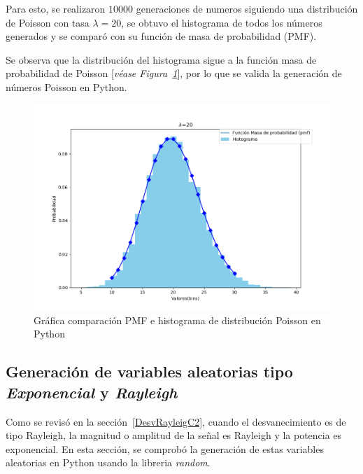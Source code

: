 Para esto, se realizaron $10000$ generaciones de numeros siguiendo una distribución de Poisson con tasa $\lambda = 20$, se obtuvo el histograma de todos los números generados y se comparó con su función de masa de probabilidad (PMF).\newline

Se observa que la distribución del histograma sigue a la función masa de probabilidad de Poisson [\textit{véase Figura~\ref{fig:generacionPoisson}}], por lo que se valida la generación de números Poisson en Python.\newline

\begin{figure}[th]
    \centering
    \includegraphics[scale=.7]{Figures/PoissonDistribution}
    \decoRule
    \caption[Gráfica comparación PMF e histograma de distribución Poisson en Python]{Gráfica comparación PMF e histograma de distribución Poisson en Python}
    \label{fig:generacionPoisson}
\end{figure}
\break

\subsection{Generación de variables aleatorias tipo \textit{Exponencial} y \textit{Rayleigh}}

Como se revisó en la sección~\ref{DesvRayleigC2}, cuando el desvanecimiento es de tipo Rayleigh, la magnitud o amplitud de la señal es Rayleigh y la potencia es exponencial. En esta sección, se comprobó la generación de estas variables aleatorias en Python usando la libreria \textit{random}.\newline

